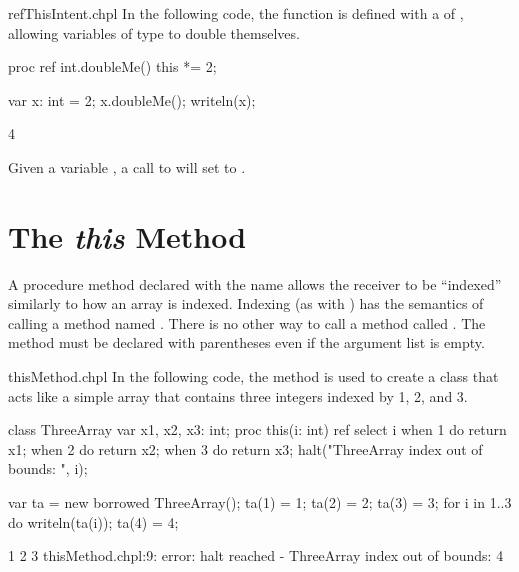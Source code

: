 \begin{chapelexample}{refThisIntent.chpl}
In the following code, the  function is defined with a
 of , allowing variables of type  to
double themselves.
\begin{chapel}
proc ref int.doubleMe() { this *= 2; }
\end{chapel}
\begin{chapelpost}
var x: int = 2;
x.doubleMe();
writeln(x);
\end{chapelpost}
\begin{chapeloutput}
4
\end{chapeloutput}
Given a variable , a call to  will set 
to .
\end{chapelexample}

\section{The {\em this} Method}
\label{The_this_Method}

A procedure method declared with the name  allows the receiver to be
``indexed'' similarly to how an array is indexed.  Indexing (as with
) has the semantics of calling a method
named .  There is no other way to call a method
called .  The  method must be declared with
parentheses even if the argument list is empty.

\begin{chapelexample}{thisMethod.chpl}
In the following code, the  method is used to create a
class that acts like a simple array that contains three integers
indexed by 1, 2, and 3.
\begin{chapel}
class ThreeArray {
  var x1, x2, x3: int;
  proc this(i: int) ref {
    select i {
      when 1 do return x1;
      when 2 do return x2;
      when 3 do return x3;
    }
    halt("ThreeArray index out of bounds: ", i);
  }
}
\end{chapel}
\begin{chapelpost}
var ta = new borrowed ThreeArray();
ta(1) = 1;
ta(2) = 2;
ta(3) = 3;
for i in 1..3 do
  writeln(ta(i));
ta(4) = 4;
\end{chapelpost}
\begin{chapeloutput}
1
2
3
thisMethod.chpl:9: error: halt reached - ThreeArray index out of bounds: 4
\end{chapeloutput}
\end{chapelexample}

